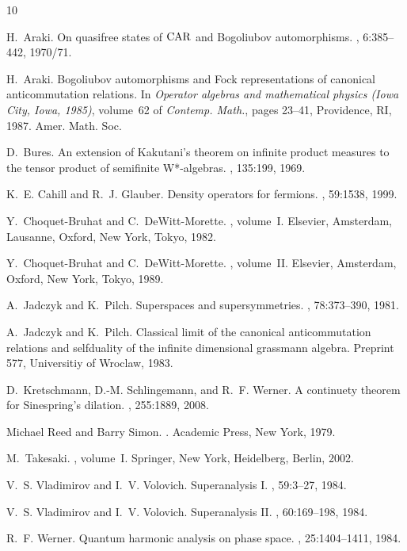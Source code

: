 \documentclass[pra,twoside,amsmath,amsfonts,amssymb,superscriptaddress,showpacs]{revtex4}
\begin{document}
\begin{thebibliography}{10}

H.~Araki.
\newblock On quasifree states of {${\rm CAR}$} and {B}ogoliubov automorphisms.
, 6:385--442, 1970/71.

H.~Araki.
\newblock Bogoliubov automorphisms and {Fock} representations of canonical
  anticommutation relations.
\newblock In {\em Operator algebras and mathematical physics (Iowa City, Iowa,
  1985)}, volume~62 of {\em Contemp. Math.}, pages 23--41, Providence, RI,
  1987. Amer. Math. Soc.

D.~Bures.
\newblock An extension of {Kakutani's} theorem on infinite product measures to
  the tensor product of semifinite {W*}-algebras.
, 135:199, 1969.

K.~E. Cahill and R.~J. Glauber.
\newblock Density operators for fermions.
, 59:1538, 1999.

Y.~Choquet-Bruhat and C.~DeWitt-Morette.
, volume~I.
\newblock Elsevier, Amsterdam, Lausanne, Oxford, New York, Tokyo, 1982.

Y.~Choquet-Bruhat and C.~DeWitt-Morette.
, volume~II.
\newblock Elsevier, Amsterdam, Oxford, New York, Tokyo, 1989.

A.~Jadczyk and K.~Pilch.
\newblock Superspaces and supersymmetries.
, 78:373--390, 1981.

A.~Jadczyk and K.~Pilch.
\newblock Classical limit of the canonical anticommutation relations and
  selfduality of the infinite dimensional grassmann algebra.
\newblock Preprint 577, Universitiy of Wroclaw, 1983.

D.~Kretschmann, D.-M. Schlingemann, and R.~F. Werner.
\newblock A continuety theorem for {Sinespring's} dilation.
, 255:1889, 2008.

Michael Reed and Barry Simon.
.
\newblock Academic Press, New York, 1979.

M.~Takesaki.
, volume~I.
\newblock Springer, New York, Heidelberg, Berlin, 2002.

V.~S. Vladimirov and I.~V. Volovich.
\newblock Superanalysis {I}.
, 59:3--27, 1984.

V.~S. Vladimirov and I.~V. Volovich.
\newblock Superanalysis {II}.
, 60:169--198, 1984.

R.~F. Werner.
\newblock Quantum harmonic analysis on phase space.
, 25:1404--1411, 1984.

\end{thebibliography}
\end{document}
